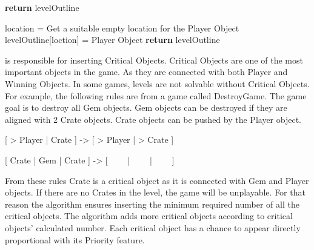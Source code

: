 \begin{algorithm}[H]
	\BlankLine
	\BlankLine
	\BlankLine
	\textbf{return} levelOutline\;
	\caption{Winning Objects Insertion Algorithm}
	\label{Algorithm:winningObjects}
\end{algorithm}

\begin{algorithm}[H]
	\BlankLine
	location = Get a suitable empty location for the Player Object\;
	levelOutline[loction] = Player Object\;
	\BlankLine
	\textbf{return} levelOutline\;
	\caption{Player Object Insertion Algorithm}
	\label{Algorithm:playerObject}
\end{algorithm}

 is responsible for inserting Critical Objects. Critical Objects are one of the most important objects in the game. As they are connected with both Player and Winning Objects. In some games, levels are not solvable without Critical Objects. For example, the following rules are from a game called DestroyGame. The game goal is to destroy all Gem objects. Gem objects can be destroyed if they are aligned with 2 Crate objects. Crate objects can be pushed by the Player object.
\begin{center} [ > Player | Crate ] -> [ > Player | > Crate ]\end{center}
\begin{center} [ Crate | Gem | Crate ] -> [ \ \ \ \ | \ \ \ \ | \ \ \ \ ]\end{center}
From these rules Crate is a critical object as it is connected with Gem and Player objects. If there are no Crates in the level, the game will be unplayable. For that reason the algorithm ensures inserting the minimum required number of all the critical objects. The algorithm adds more critical objects according to critical objects' calculated number. Each critical object has a chance to appear directly proportional with its Priority feature.\\

